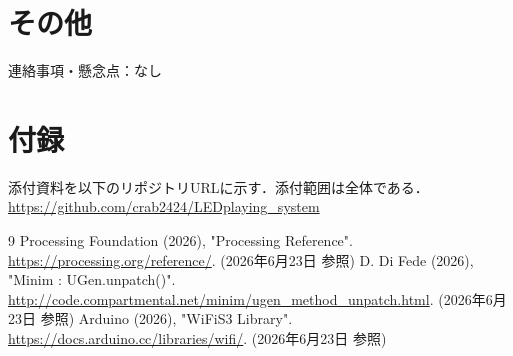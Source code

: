 \documentclass[lualatex,paper=a4paper,jafontsize=11.5pt,jafontscale=1.05]{jlreq}
\begin{document}
\section{その他}
連絡事項・懸念点：なし

\section{付録}
添付資料を以下のリポジトリURLに示す．添付範囲は全体である．\\
\url{https://github.com/crab2424/LEDplaying_system}



\begin{thebibliography}{9}
 Processing Foundation (2026), "Processing Reference". \url{https://processing.org/reference/}. (2026年6月23日 参照)
 D. Di Fede (2026), "Minim : UGen.unpatch()". \url{http://code.compartmental.net/minim/ugen_method_unpatch.html}. (2026年6月23日 参照)
 Arduino (2026), "WiFiS3 Library". \url{https://docs.arduino.cc/libraries/wifi/}. (2026年6月23日 参照)
\end{thebibliography}
\end{document}
